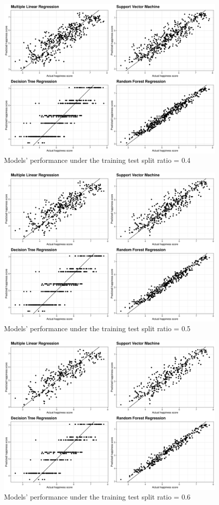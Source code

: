 \documentclass[11pt,a4paper,]{article}
\begin{document}
\begin{figure}

{\centering \includegraphics[width=0.7\linewidth]{figure/ggsp04} 

}

\caption{Models' performance under the training test split ratio = 0.4}\label{fig:ggsp04}
\end{figure}

\begin{figure}

{\centering \includegraphics[width=0.7\linewidth]{figure/ggsp05} 

}

\caption{Models' performance under the training test split ratio = 0.5}\label{fig:ggsp05}
\end{figure}

\begin{figure}

{\centering \includegraphics[width=0.7\linewidth]{figure/ggsp06} 

}

\caption{Models' performance under the training test split ratio = 0.6}\label{fig:ggsp06}
\end{figure}
\end{document}

